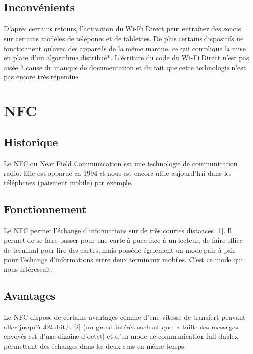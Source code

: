 \documentclass[a4paper,10pt]{report}
\begin{document}
    \subsection{Inconvénients}
    \paragraph{}
    D'après certains retours, l'activation du Wi-Fi Direct peut entraîner des soucis sur certains modèles de télépones et de tablettes. De plus certains dispositifs ne fonctionnent qu'avec des appareils de la même marque, ce qui complique la mise en place d'un algorithme distribué*.
    L'écriture du code du Wi-Fi Direct n'est pas aisée à cause du manque de documentation et du fait que cette technologie n'est pas encore très répendue.
  \section{NFC}
    \subsection{Historique}
     \paragraph{}
     Le NFC ou Near Field Communication est une technologie de communication radio. Elle est apparue en 1994 et nous est encore utile aujourd'hui dans les téléphones (paiement mobile) par exemple.
    \subsection{Fonctionnement}
     \paragraph{}
     Le NFC permet l'échange d'informations sur de très courtes distances [1]. Il permet de se faire passer pour une carte à puce face à un lecteur, de faire office de terminal pour lire des cartes, mais possède également un mode pair à pair pour l'échange d'informations entre deux terminaux mobiles. C'est ce mode qui nous intéressait.
    \subsection{Avantages}
    \paragraph{}
    Le NFC dispose de certains avantages comme d'une vitesse de transfert pouvant aller jusqu'à 424kbit/s [2] (un grand intérêt sachant que la taille des messages envoyés est d'une dizaine d'octet) et d'un mode de communication full duplex permettant des échanges dans les deux sens en même temps.
\end{document}

